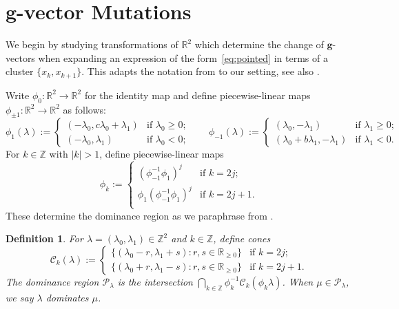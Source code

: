 \documentclass{amsart}
\newtheorem{definition}[theorem]{Definition}
\numberwithin{theorem}{section}
\newcommand{\bfg}{\boldsymbol{g}}
\newcommand{\cC}{\mathcal{C}}
\newcommand{\cP}{\mathcal{P}}
\newcommand{\RR}{\mathbb{R}}
\newcommand{\ZZ}{\mathbb{Z}}
\begin{document}
\section{$\bfg$-vector Mutations}
\label{sec:tropical}

  We begin by studying transformations of $\RR^2$ which determine the change of $\bfg$-vectors when expanding an expression of the form~\eqref{eq:pointed} in terms of a cluster $\{x_k,x_{k+1}\}$.
  This adapts the notation from \cite[Definition 2.1.4]{Qin19} to our setting, see also \cite[Definition 4.1]{Rea14}.

  Write $\phi_0:\RR^2\to\RR^2$ for the identity map and define piecewise-linear maps $\phi_{\pm 1}:\RR^2\to\RR^2$ as follows:
  \begin{equation}
    \label{eq:forward mutation 1}
    \phi_1(\lambda)
    :=
    \begin{cases} 
      (-\lambda_0,c\lambda_0+\lambda_1) & \text{if $\lambda_0 \ge 0$;}\\
      (-\lambda_0,\lambda_1) & \text{if $\lambda_0 < 0$;}
    \end{cases}
    \qquad
    \phi_{-1}(\lambda)
    :=
    \begin{cases} 
      (\lambda_0,-\lambda_1) & \text{if $\lambda_1 \ge 0$;}\\
      (\lambda_0+b\lambda_1,-\lambda_1) & \text{if $\lambda_1 < 0$.}
    \end{cases}
  \end{equation}
  For $k\in\ZZ$ with $|k|>1$, define piecewise-linear maps
  \[\phi_k
    :=
    \begin{cases}
      (\phi_{-1}^{-1}\phi_1)^j & \text{if $k=2j$;}\\
      \phi_1(\phi_{-1}^{-1}\phi_1)^j & \text{if $k=2j+1$.}\\
    \end{cases}
  \]
  These determine the dominance region as we paraphrase from \cite[Section 3.1]{Qin19}.
  \begin{definition}
    \label{def:dominance}
    For $\lambda=(\lambda_0,\lambda_1)\in\ZZ^2$ and $k\in\ZZ$, define cones 
    \[\cC_k(\lambda)
      :=
      \begin{cases}
        \{(\lambda_0-r,\lambda_1+s):r,s\in\RR_{\ge0}\} & \text{if $k=2j$;}\\
        \{(\lambda_0+r,\lambda_1-s):r,s\in\RR_{\ge0}\} & \text{if $k=2j+1$.}
      \end{cases}
    \]
    The \emph{dominance region} $\cP_\lambda$ is the intersection  $\bigcap_{k\in\ZZ}\phi_k^{-1}\cC_k(\phi_k\lambda)$.
    When $\mu\in\cP_\lambda$, we say \emph{$\lambda$ dominates $\mu$}.
  \end{definition}
\end{document}
